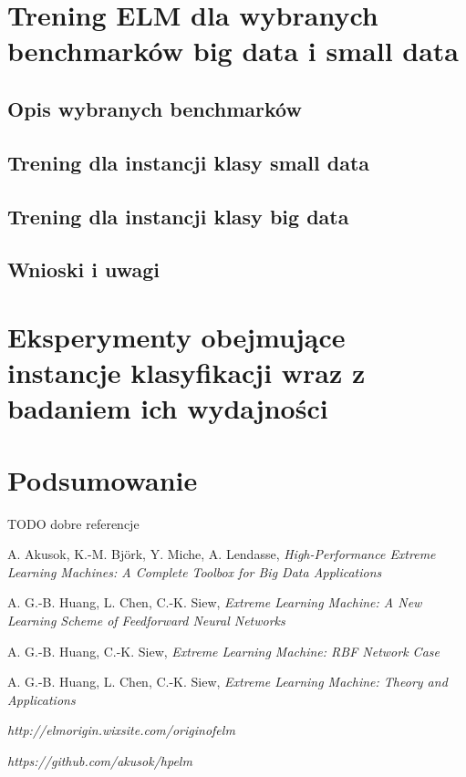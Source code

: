 \documentclass{article}
\begin{document}
\section{Trening ELM dla wybranych benchmarków big data i small data}
\subsection{Opis wybranych benchmarków}
\subsection{Trening dla instancji klasy small data}
\subsection{Trening dla instancji klasy big data}
\subsection{Wnioski i uwagi}

\clearpage
\section{Eksperymenty obejmujące instancje klasyfikacji wraz z badaniem ich wydajności}
\clearpage
\section*{Podsumowanie}

\clearpage
{}

TODO dobre referencje
\begin{thebibliography}{9}
  A. Akusok, K.-M. Björk, Y. Miche, A. Lendasse,
  \emph{High-Performance Extreme Learning Machines: A Complete Toolbox for Big Data Applications}


  A. G.-B. Huang, L. Chen, C.-K. Siew, 
  \emph{Extreme Learning Machine: A New Learning Scheme of Feedforward Neural Networks}
  
  A. G.-B. Huang, C.-K. Siew, 
  \emph{Extreme Learning Machine: RBF Network Case} 

  A. G.-B. Huang, L. Chen, C.-K. Siew, 
  \emph{Extreme Learning Machine: Theory and Applications} 
  
  \emph{http://elmorigin.wixsite.com/originofelm}  
  
  \emph{https://github.com/akusok/hpelm}  
\end{thebibliography}
\end{document}
